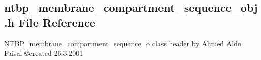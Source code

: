 \subsection{ntbp\_\-membrane\_\-compartment\_\-sequence\_\-obj.h File Reference}
\label{ntbp__membrane__compartment__sequence__obj_8h}



\begin{DoxyItemize}
\item \hyperlink{class_n_t_b_p__membrane__compartment__sequence__o}{NTBP\_\-membrane\_\-compartment\_\-sequence\_\-o} class header by Ahmed Aldo Faisal \copyright created 26.3.2001 
\end{DoxyItemize} 


